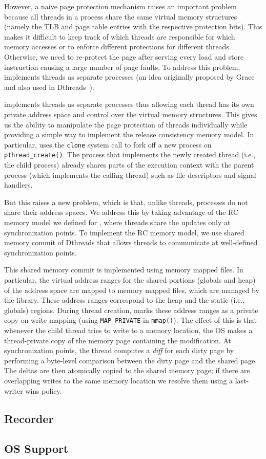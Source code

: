 However, a naive page protection mechanism raises an important problem because all threads in a process share the same virtual memory
structures (namely the TLB and page table entries with the respective protection bits). This makes it difficult to keep track of which
threads are responsible for which memory accesses or to enforce different protections for different threads. Otherwise, we need to re-protect the page after serving every load and store instruction causing a large number of page faults.
To address this problem, \projecttitle implements threads as separate
processes (an idea originally proposed by Grace~\cite{grace-oopsla-2009} and also used in Dthreads~\cite{dthreads-sosp-2011}).

 \projecttitle  implements threads as separate processes thus allowing each thread has its own private address space and control over the virtual
memory structures.   This gives us the ability to manipulate the page protection of threads individually while providing a simple way to implement the release consistency memory
model. In particular, \projecttitle uses the {\tt clone} system call to fork off a new process on {\tt pthread\_create()}. The process that implements the newly created thread (i.e., the child process) already
shares parts of the execution context with the parent process (which implements the calling thread) such as file descriptors and signal handlers. 


But this raises a new problem, which is that, unlike threads, processes do not share their address spaces. We address this by taking advantage of the RC memory model we defined for \projecttitle, where threads share the updates only at synchronization points.  To implement the RC memory model, we use shared memory commit of Dthreads that allows threads to communicate at well-defined synchronization points.


 This shared memory commit is implemented using memory mapped files. In
particular, the virtual address ranges for the shared portions (globals and heap) of
the address space are mapped to memory mapped files, which are managed by the
\projecttitle library. These address ranges correspond to the heap and
the static (i.e., globals) regions.  During thread creation,
\projecttitle marks these address ranges as a private copy-on-write
mapping (using {\tt MAP\_PRIVATE} in {\tt mmap()}). The effect of this
is that whenever the child thread tries to write to a memory location,
the OS makes a thread-private copy of the memory page containing the
modification.  At synchronization points, the thread computes a {\em diff}
for each dirty page by performing a byte-level comparison between the
dirty page and the shared page. The deltas are then atomically
copied to the shared memory page; if there are overlapping writes
to the same memory location we resolve them using a last-writer wins policy.
\subsection{Recorder}

\subsection{OS Support}